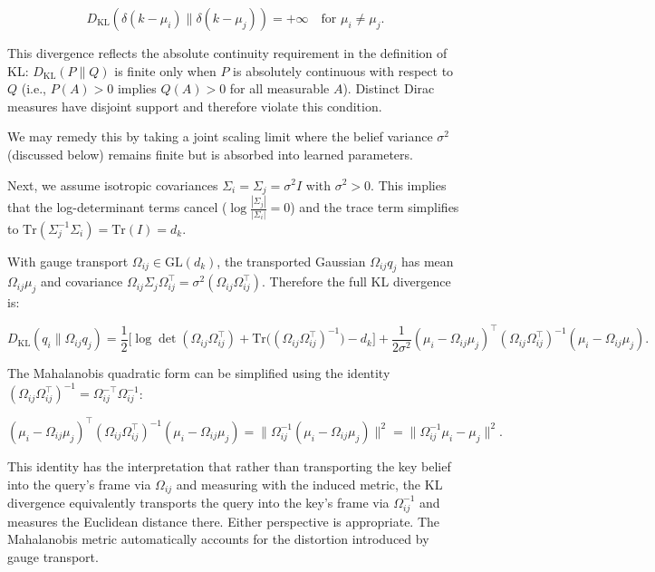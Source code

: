 \documentclass[twoside,11pt]{article}
\begin{document}
\begin{equation}
D_{\mathrm{KL}}(\delta(k - \mu_i) \| \delta(k - \mu_j)) = +\infty \quad \text{for } \mu_i \neq \mu_j.
\end{equation}

This divergence reflects the absolute continuity requirement in the definition of KL: $D_{\mathrm{KL}}(P \| Q)$ is finite only when $P$ is absolutely continuous with respect to $Q$ (i.e., $P(A) > 0$ implies $Q(A) > 0$ for all measurable $A$). Distinct Dirac measures have disjoint support and therefore violate this condition.

We may remedy this by taking a joint scaling limit where the belief variance $\sigma^2$ (discussed below) remains finite but is absorbed into learned parameters.

Next, we assume isotropic covariances $\Sigma_i = \Sigma_j = \sigma^2 I$ with $\sigma^2 > 0$. This implies that the log-determinant terms cancel ($\log\frac{|\Sigma_j|}{|\Sigma_i|} = 0$) and the trace term simplifies to $\mathrm{Tr}(\Sigma_j^{-1}\Sigma_i) = \mathrm{Tr}(I) = d_k$.

With gauge transport $\Omega_{ij} \in \mathrm{GL}(d_k)$, the transported Gaussian $\Omega_{ij}q_j$ has mean $\Omega_{ij}\mu_j$ and covariance $\Omega_{ij}\Sigma_j\Omega_{ij}^\top = \sigma^2(\Omega_{ij}\Omega_{ij}^\top)$. Therefore the full KL divergence is:

\begin{equation}
D_{\mathrm{KL}}(q_i \| \Omega_{ij}q_j) = \frac{1}{2}\Big[\log\det(\Omega_{ij}\Omega_{ij}^\top) + \mathrm{Tr}\big((\Omega_{ij}\Omega_{ij}^\top)^{-1}\big) - d_k\Big] + \frac{1}{2\sigma^2}(\mu_i - \Omega_{ij}\mu_j)^\top(\Omega_{ij}\Omega_{ij}^\top)^{-1}(\mu_i - \Omega_{ij}\mu_j).
\end{equation}

The Mahalanobis quadratic form can be simplified using the identity $(\Omega_{ij}\Omega_{ij}^\top)^{-1} = \Omega_{ij}^{-\top}\Omega_{ij}^{-1}$:

\begin{equation}
(\mu_i - \Omega_{ij}\mu_j)^\top(\Omega_{ij}\Omega_{ij}^\top)^{-1}(\mu_i - \Omega_{ij}\mu_j) = \|\Omega_{ij}^{-1}(\mu_i - \Omega_{ij}\mu_j)\|^2 = \|\Omega_{ij}^{-1}\mu_i - \mu_j\|^2.
\label{eq:mahalanobis_identity}
\end{equation}

This identity has the interpretation that rather than transporting the key belief into the query's frame via $\Omega_{ij}$ and measuring with the induced metric, the KL divergence equivalently transports the query into the key's frame via $\Omega_{ij}^{-1}$ and measures the Euclidean distance there. Either perspective is appropriate. The Mahalanobis metric automatically accounts for the distortion introduced by gauge transport.
\end{document}
